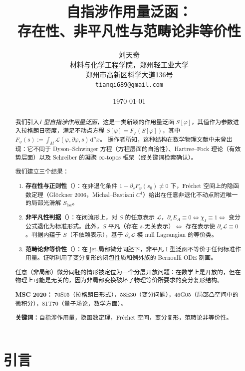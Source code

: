 \documentclass[12pt,a4paper]{article}
\title{自指涉作用量泛函：\\
存在性、非平凡性与范畴论非等价性}
\author{刘天奇\\
材料与化学工程学院，郑州轻工业大学\\
郑州市高新区科学大道136号\\
\texttt{tianqi689@gmail.com}
}
\date{\today}
\theoremstyle{definition}
\newcommand{\mL}{\mathcal{L}}
\newcommand{\diff}{\mathrm{d}}
\newcommand{\dVol}{\,\diff^n x}
\begin{document}
\maketitle

\begin{abstract}
我们引入\emph{I 型自指涉作用量泛函}，这是一类新颖的作用量泛函 $S[\varphi]$，其值作为参数进入拉格朗日密度，满足不动点方程
$S[\varphi] = F_\varphi(S[\varphi])$，其中 $F_\varphi(s) := \int_M \mL(\varphi, \partial\varphi, s) \dVol$。
据作者所知，这种结构在数学物理文献中未曾出现：它不同于 Dyson--Schwinger 方程（方程层面的自洽性）、Hartree--Fock 理论（有效势层面）以及 Schreiber 的凝聚 $\infty$-topos 框架（经关键词检索确认）。

我们建立三个结果：
\begin{enumerate}[leftmargin=*]
\item \textbf{存在性与正则性}（）：在非退化条件 $1 - \partial_s F_\varphi(s_0) \neq 0$ 下，Fr\'echet 空间上的隐函数定理（Gl\"ockner 2006，Michal--Bastiani $C^1$）给出在任意非退化不动点附近唯一的局部光滑解 $S_{\mathrm{loc}}$。
\item \textbf{非平凡性判据}（）：在闭流形上，对 $S$ 的任意表示 $\mL$，$\partial_s E_A \equiv 0 \iff \chi_I \equiv 1 \iff$ 变分公式退化为标准形式。此外，$S$ 平凡（存在 $s$-无关表示）$\iff$ 存在表示使 $\partial_s \mL \equiv 0$。判据内蕴于 $S$（不依赖表示），基于 $\partial_s\mathcal{L}$ 模 null Lagrangian 的等价类。
\item \textbf{范畴论非等价性}（）：在 jet-局部微分同胚下，非平凡 I 型泛函不等价于任何标准作用量。证明利用了变分复形的闭包性质和例外族的 Bernoulli ODE 刻画。
\end{enumerate}

任意（非局部）微分同胚的情形被定位为一个分层开放问题：在数学上是开放的，但在物理上可能是无关的，因为非局部变换破坏了物理等价所要求的变分复形结构。

\medskip
\noindent\textbf{MSC 2020：} 70S05（拉格朗日形式），58E30（变分问题），46G05（局部凸空间中的微积分），81T70（量子场论，数学方面）。

\medskip
\noindent\textbf{关键词：}自指涉作用量，隐函数定理，Fr\'echet 空间，变分复形，范畴论非等价性。
\end{abstract}

\tableofcontents
\newpage

\section{引言}
\label{sec:intro}
\end{document}
